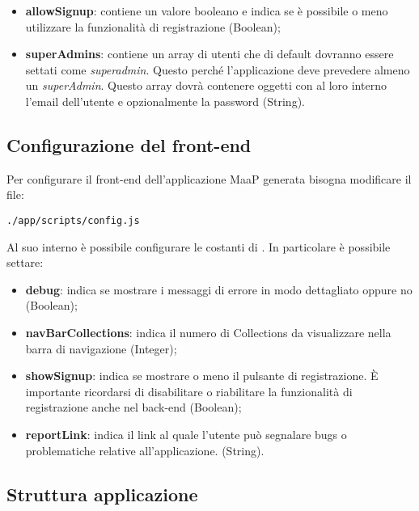 \begin{itemize}
\item \textbf{allowSignup}: contiene un valore booleano e indica se è possibile o meno utilizzare la funzionalità di registrazione (Boolean);

\item \textbf{superAdmins}: contiene un array di utenti che di default dovranno essere settati come \textit{superadmin}. Questo perché l'applicazione deve prevedere almeno un \textit{superAdmin}. Questo array dovrà contenere oggetti con al loro interno l'email dell'utente e opzionalmente la password (String).

\end{itemize}

\subsection{Configurazione del front-end}

Per configurare il front-end dell'applicazione MaaP generata bisogna modificare il file:

\centerline{\texttt{./app/scripts/config.js}}

Al suo interno è possibile configurare le costanti di . In particolare è possibile settare:

\begin{itemize}

	\item \textbf{debug}: indica se mostrare i messaggi di errore in modo dettagliato oppure no (Boolean);

	\item \textbf{navBarCollections}: indica il numero di Collections da visualizzare nella barra di navigazione (Integer);

	\item \textbf{showSignup}: indica se mostrare o meno il pulsante di registrazione. È importante ricordarsi di disabilitare o riabilitare la funzionalità di registrazione anche nel back-end (Boolean);

	\item \textbf{reportLink}: indica il link al quale l'utente può segnalare bugs o problematiche relative all'applicazione.  (String).

\end{itemize}


\subsection{Struttura applicazione}

